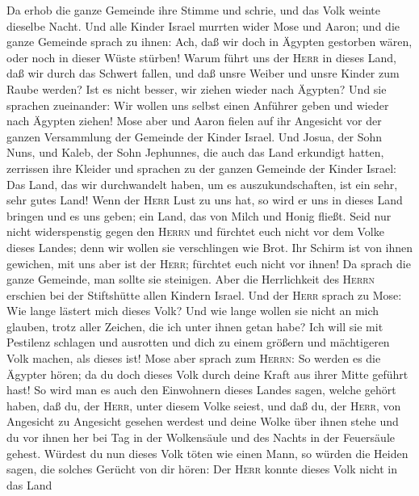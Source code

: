  Da erhob die ganze Gemeinde ihre Stimme und schrie, und
das Volk weinte dieselbe Nacht.  Und alle Kinder Israel
murrten wider Mose und Aaron; und die ganze Gemeinde sprach zu ihnen:
Ach, daß wir doch in Ägypten gestorben wären, oder noch in dieser Wüste
stürben!  Warum führt uns der \textsc{Herr} in dieses
Land, daß wir durch das Schwert fallen, und daß unsre Weiber und unsre
Kinder zum Raube werden? Ist es nicht besser, wir ziehen wieder nach
Ägypten?  Und sie sprachen zueinander: Wir wollen uns
selbst einen Anführer geben und wieder nach Ägypten ziehen!
 Mose aber und Aaron fielen auf ihr Angesicht vor der
ganzen Versammlung der Gemeinde der Kinder Israel.  Und
Josua, der Sohn Nuns, und Kaleb, der Sohn Jephunnes, die auch das Land
erkundigt hatten, zerrissen ihre Kleider und sprachen zu der ganzen
Gemeinde der Kinder Israel:  Das Land, das wir
durchwandelt haben, um es auszukundschaften, ist ein sehr, sehr gutes
Land!  Wenn der \textsc{Herr} Lust zu uns hat, so wird er
uns in dieses Land bringen und es uns geben; ein Land, das von Milch und
Honig fließt.  Seid nur nicht widerspenstig gegen den
\textsc{Herrn} und fürchtet euch nicht vor dem Volke dieses Landes; denn
wir wollen sie verschlingen wie Brot. Ihr Schirm ist von ihnen gewichen,
mit uns aber ist der \textsc{Herr}; fürchtet euch nicht vor ihnen!
 Da sprach die ganze Gemeinde, man sollte sie steinigen.
Aber die Herrlichkeit des \textsc{Herrn} erschien bei der Stiftshütte
allen Kindern Israel.  Und der \textsc{Herr} sprach zu
Mose: Wie lange lästert mich dieses Volk? Und wie lange wollen sie nicht
an mich glauben, trotz aller Zeichen, die ich unter ihnen getan habe?
 Ich will sie mit Pestilenz schlagen und ausrotten und
dich zu einem größern und mächtigeren Volk machen, als dieses ist!
 Mose aber sprach zum \textsc{Herrn}: So werden es die
Ägypter hören; da du doch dieses Volk durch deine Kraft aus ihrer Mitte
geführt hast!  So wird man es auch den Einwohnern dieses
Landes sagen, welche gehört haben, daß du, der \textsc{Herr}, unter
diesem Volke seiest, und daß du, der \textsc{Herr}, von Angesicht zu
Angesicht gesehen werdest und deine Wolke über ihnen stehe und du vor
ihnen her bei Tag in der Wolkensäule und des Nachts in der Feuersäule
gehest.  Würdest du nun dieses Volk töten wie einen Mann,
so würden die Heiden sagen, die solches Gerücht von dir hören:
 Der \textsc{Herr} konnte dieses Volk nicht in das Land
